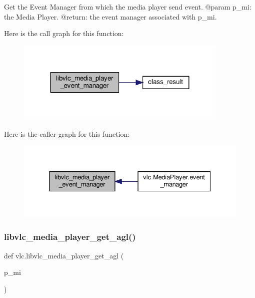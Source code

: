 \begin{DoxyVerb}Get the Event Manager from which the media player send event.
@param p_mi: the Media Player.
@return: the event manager associated with p_mi.
\end{DoxyVerb}
 Here is the call graph for this function\+:
\nopagebreak
\begin{figure}[H]
\begin{center}
\leavevmode
\includegraphics[width=287pt]{namespacevlc_a342f922c85a8846fd115bc0dfb1db186_cgraph}
\end{center}
\end{figure}
Here is the caller graph for this function\+:
\nopagebreak
\begin{figure}[H]
\begin{center}
\leavevmode
\includegraphics[width=331pt]{namespacevlc_a342f922c85a8846fd115bc0dfb1db186_icgraph}
\end{center}
\end{figure}
\mbox{\label{namespacevlc_a801a636edb9f5b1a8b3095f7feb10aa6}} 
\subsubsection{\texorpdfstring{libvlc\+\_\+media\+\_\+player\+\_\+get\+\_\+agl()}{libvlc\_media\_player\_get\_agl()}}
{\footnotesize\ttfamily def vlc.\+libvlc\+\_\+media\+\_\+player\+\_\+get\+\_\+agl (\begin{DoxyParamCaption}\item[{}]{p\+\_\+mi }\end{DoxyParamCaption})}

